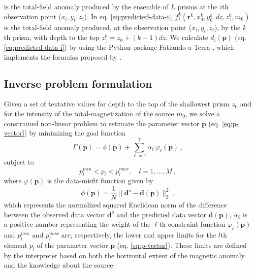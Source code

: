 is the total-field anomaly produced by the ensemble of $L$ prisms at the $i$th observation point ($x_{i}, y_{i}, z_{i}$). 
In eq. \ref{eq:predicted-data-i}, $f_{i}^{k}(\mathbf{r}^{k}, x_{0}^{k}, y_{0}^{k}, dz, z_{1}^{k}, m_{0})$ is the total-field anomaly 
produced, at the observation point ($x_{i}, y_{i}, z_{i}$), by the $k$th prism, with depth to the top $z_{1}^{k} = z_{0} + (k-1)dz$.
We calculate $d_{i} (\mathbf{p})$ (eq. \ref{eq:predicted-data-i}) by using the Python package Fatiando a Terra \citep{uieda-etal2013}, 
which implements the formulas proposed by \cite{plouff1976}.

\subsection{Inverse problem formulation}

Given a set of tentative values for depth to the top of the shallowest prism $z_{0}$ and for the intensity of the 
total-magnetization of the source $m_{0}$, we solve a constrained non-linear problem to estimate the parameter 
vector $\mathbf{p}$ (eq. \ref{eq:p-vector}) by minimizing the goal function
\begin{equation}
\Gamma (\mathbf{p}) = \phi (\mathbf{p}) + \sum\limits^{7}_{\ell =1} \alpha_{\ell} \, \varphi_{\ell}(\mathbf{p}) \: ,
\label{eq:gamma}
\end{equation}
subject to
\begin{equation}
p_{l}^{min} < p_{l} < p_{l}^{max}, \quad l = 1, \dots, M \: ,
\label{eq:inequality-constraint}
\end{equation}
where $\varphi (\mathbf{p})$ is the data-misfit function given by
\begin{equation}\label{eq:misfit}
\phi (\mathbf{p}) = \frac{1}{N} \| \mathbf{d}^{o} - \mathbf{d}(\mathbf{p}) \|_{2}^{2} \: ,
\end{equation}
which represents the normalized squared Euclidean norm of the difference between the observed data vector $\mathbf{d}^{o}$ and 
the predicted data vector $\mathbf{d}(\mathbf{p})$, $\alpha_{\ell}$ is a positive number representing the weight of the 
$\ell$th constraint function $\varphi_{\ell}(\mathbf{p})$ and $p_{l}^{min}$ and $p_{l}^{max}$ are, respectively, the lower and 
upper limits for the $l$th element $p_{l}$ of the parameter vector $\mathbf{p}$ (eq. \ref{eq:p-vector}). 
These limits are defined by the interpreter based on both the horizontal extent of the magnetic anomaly and the knowledge 
about the source.

